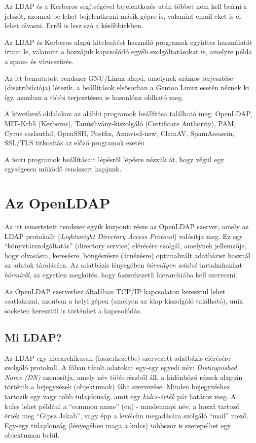 \documentclass[fleqn,10pt,a4paper,titlepage]{article}
\begin{document}
  Az LDAP és a Kerberos segítségével bejelentkezés után többet nem kell beírni a jelszót, azonnal be lehet bejelentkezni
  másik gépre is, valamint email-eket is el lehet olvasni. Erről is lesz szó a későbbiekben.

  Az LDAP és Kerberos alapú hitelesítést használó programok együttes használatát írtam le, valamint a hozzájuk
  kapcsolódó egyéb szolgáltatásokat is, amelyre példa a spam- és vírusszűrés.

  Az itt bemutatott rendszer GNU/Linux alapú, amelynek számos terjesztése (disztribúciója) létezik, a beállítások
  elsősorban a Gentoo Linux esetén néznek ki így, azonban a többi terjesztésen is hasonlóan oldható meg.

  A következő oldalakon az alábbi programok beállítása található meg:
  OpenLDAP,
  MIT-Krb5 (Kerberos),
  Tanúsítvány-kiszolgáló (Certificate Authority),
  PAM,
  Cyrus saslauthd,
  OpenSSH,
  Postfix,
  Amavisd-new,
  ClamAV,
  SpamAssassin,
  SSL/TLS titkosítás az előző programok esetén
  
  A fenti programok beállításait lépésről lépésre nézzük át, hogy végül egy egységesen működő rendszert kapjunk.
  
  \newpage
  \section{Az OpenLDAP}

  Az itt ismertetett rendszer egyik központi része az OpenLDAP szerver, amely az LDAP protokollt ({\em Lightweight
    Directory Access Protocol}) valósítja meg. Ez egy ``könyvtárszolgáltatás''
  (directory service) elérésére szolgál, amelynek jellemzője, hogy olvasásra, keresésre, böngészésre (átnézésre)
  optimalizált adatbázist használ az adatok tárolására. Az adatbázis lényegében \emph{bármilyen adatot} tartalmhazhat
  \emph{bármiről}, az egyetlen megkötés, hogy faszerkezetű hierarchiába kell szervezni.

  Az OpenLDAP szerverhez általában TCP/IP kapcsolaton keresztül lehet csatlakozni, azonban a helyi gépen (amelyen az
  ldap kiszolgáló található), unix socketen keresztül is történhet a kapcsolódás.
  
  \subsection{Mi LDAP?}

  Az LDAP egy hierarchikusan (faszerkezetbe) szervezett adatbázis elérésére szolgáló protokoll. A fában tárolt adatokat
  egy-egy egyedi név: {\em Distinguished Name (DN)} azonosítja, amely név több részből áll, a  különböző részek alapján
  történik a bejegyzések (objektumok) fába szervezése. Minden bejegyzéshez tartozik egy vagy több
  tulajdonság, amit egy {\em kulcs-érték} pár határoz meg. A kulcs lehet például a ``common name'' (cn) - mindennapi
  név, a hozzá tartozó érték meg ``Gipsz Jakab'', vagy épp a levélcím megadására szolgáló ``mail'' mező. Egy-egy
  tulajdonság (lényegében maga a kulcs) többször is szerepelhet egy objektumon belül.
\end{document}
